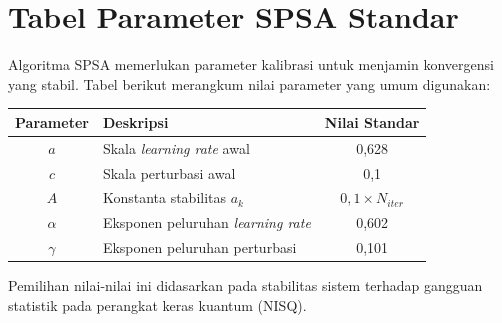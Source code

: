 \section{Tabel Parameter SPSA Standar}
Algoritma SPSA memerlukan parameter kalibrasi untuk menjamin konvergensi yang stabil.
Tabel berikut merangkum nilai parameter yang umum digunakan:
\begin{longtable}{|c|l|c|}
\hline
\textbf{Parameter} & \textbf{Deskripsi} & \textbf{Nilai Standar} \\ \hline
$a$ & Skala \textit{learning rate} awal & 0,628 \\ \hline
$c$ & Skala perturbasi awal & 0,1 \\ \hline
$A$ & Konstanta stabilitas $a_k$ & $0,1 \times N_{iter}$ \\ \hline
$\alpha$ & Eksponen peluruhan \textit{learning rate} & 0,602 \\ \hline
$\gamma$ & Eksponen peluruhan perturbasi & 0,101 \\ \hline
\end{longtable}
Pemilihan nilai-nilai ini didasarkan pada stabilitas sistem terhadap gangguan statistik pada perangkat keras kuantum (NISQ).
